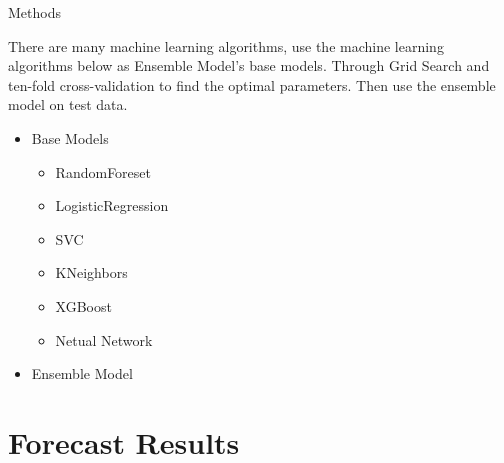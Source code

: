 \documentclass[
size=14pt,
paper=smartboard,  %
mode=present, 		%
display=slides, 	%
pauseslide,
fleqn,leqno]{powerdot}
\begin{document}
\begin{slide}[toc=,bm=]{Methods}

There are many machine learning algorithms, 
use the machine learning algorithms below
as Ensemble Model’s base models. 
Through Grid Search and
ten-fold cross-validation
to find the optimal parameters.
Then use the ensemble model on
test data.

\begin{center}
	\begin{itemize}
		\item Base Models
		\
		\begin{itemize}
			\item RandomForeset
			\item LogisticRegression
			\item SVC
			\item KNeighbors
			\item XGBoost
			\item Netual Network
		\end{itemize}
	    \item Ensemble Model
	\end{itemize}
\end{center}

\end{slide}


\section{Forecast Results}
\end{document}
